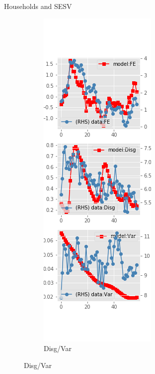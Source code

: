 \documentclass{beamer}
\begin{document}
\begin{frame}{Households and SESV}
	\begin{figure}[ht]
		\label{SESV_diag_SCE}
		\begin{subfigure}[b]{0.2\textwidth}
			\centering
			\caption{Disg/Var}
			\includegraphics[width=\textwidth, height = 0.8\textheight]{figuresDraft/sce_se_est_sv_diag0.png}

\end{subfigure}
\end{figure}
\end{frame}
\end{document}
